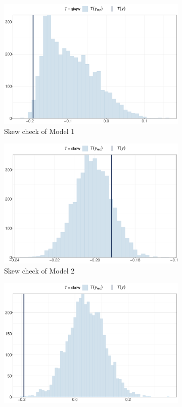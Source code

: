 \documentclass[a4paper]{article}   	%
\begin{document}
	\begin{figure}[!htp]
		\centering
		\begin{subfigure}[t]{0.45\textwidth}
			\includegraphics[width=\linewidth]{Images/skew_GSRNS}
			\caption{Skew check of Model 1}
		\end{subfigure}
		\begin{subfigure}[t]{0.45\textwidth}
			\includegraphics[width=\linewidth]{Images/skew_GSRand}
			\caption{Skew check of Model 2}
		\end{subfigure}
		\begin{subfigure}[t]{0.45\textwidth}
			\includegraphics[width=\linewidth]{Images/skew_STRNS}

\end{subfigure}
\end{figure}
\end{document}
